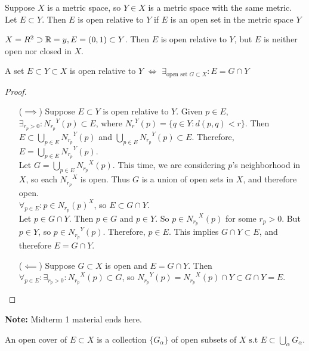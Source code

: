 \begin{definition}
	Suppose $X$ is a metric space, so $Y \in X$ is a metric space with the same metric. Let $E \subset Y$. Then $E$ is open relative to $Y$ if $E$ is an open set in the metric space $Y$
\end{definition}

\begin{example}
	$X=R^2 \supset \mathbb{R} =y, E=(0,1) \subset Y$. Then $E$ is open relative to $Y$, but $E$ is neither open nor closed in $X$.
\end{example}

\begin{theorem}
	A set $E \subset Y \subset X$ is open relative to $Y$ $\Leftrightarrow $ $\exists_{\text{open set }G \subset  X}: E=G \cap Y$
	\begin{proof}
		\begin{itemize}
			\item[($\implies$)] Suppose $E \subset Y$ is open relative to $Y$. Given $p \in E$, $\exists_{r_p>0}: {N_{r_p}}^{Y}(p) \subset E$, where ${N_r}^{Y}(p)=\{q \in Y: d(p,q)<r\}$.
			      Then $E \subset \bigcup_{p \in E} {N_{r_p}}^{Y}(p)$ and $\bigcup_{p \in E} {N_{r_p}}^{Y}(p) \subset E$.
			      Therefore, $E= \bigcup_{p \in E} {N_{r_p}}^{Y}(p)$.\\
			      Let $G= \bigcup_{p \in E}{N_{r_p}}^{X}(p)$.
			      This time, we are considering $p$'s neighborhood in $X$, so each ${N_{r_p}}^{X}$ is open.
			      Thus $G$ is a union of open sets in $X$, and therefore open.\\
			      $\forall_{p \in E}: p \in {N_{r_p}(p)}^{X}$, so $E \subset G \cap Y$.\\
			      Let $p \in G \cap Y$. Then $p \in G$ and $p \in Y$. So $p \in {N_{r_p}}^{X}(p)$ for some $r_p>0$. But $p \in Y$, so $p \in {N_{r_p}}^{Y}(p)$. Therefore, $p \in E$. This implies $G \cap Y \subset E$, and therefore $E=G \cap Y$.
			\item [($\impliedby$)]
			      Suppose $G \subset X$ is open and $E= G \cap Y$.
			      Then $\forall_{p \in E}: \exists_{r_p>0}: {N_{r_p}}^{X}(p) \subset G $, so ${N_{r_p}}^{Y}(p)={N_{r_p}}^{X}(p) \cap Y \subset G \cap Y=E$.
		\end{itemize}
	\end{proof}
\end{theorem}

\textbf{Note:} Midterm 1 material ends here.


\begin{definition}
	An open cover of $E \subset X$ is a collection $\{G_{\alpha}\}$ of open subsets of $X \text{ s.t } E \subset \bigcup_{\alpha} G_{\alpha}$.
\end{definition}

